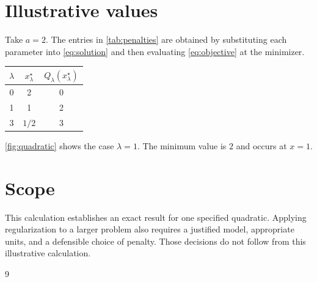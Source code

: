 \section{Illustrative values}
Take $a=2$. The entries in \autoref{tab:penalties} are obtained by substituting
each parameter into \eqref{eq:solution} and then evaluating
\eqref{eq:objective} at the minimizer.
\begin{center}
\begin{tabular}{ccc}
\toprule
$\lambda$ & $x_\lambda^\star$ & $Q_\lambda(x_\lambda^\star)$\\
\midrule
0 & 2 & 0\\
1 & 1 & 2\\
3 & $1/2$ & 3\\
\bottomrule
\end{tabular}
\end{center}
\autoref{fig:quadratic} shows the case $\lambda=1$. The minimum value is $2$
and occurs at $x=1$.
\begin{tikzpic}
\end{tikzpic}
\section{Scope}
This calculation establishes an exact result for one specified quadratic.
Applying regularization to a larger problem also requires a justified model,
appropriate units, and a defensible choice of penalty. Those decisions do not
follow from this illustrative calculation.
{}
\begin{thebibliography}{9}
\end{thebibliography}

